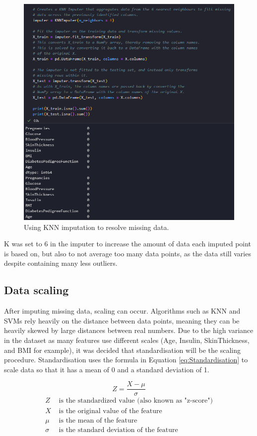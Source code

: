 \documentclass[12pt]{report}
\newcommand{\para}{\vspace{8pt}\noindent}
\begin{document}
\begin{figure}[H]
    \centering
    \includegraphics[width=.8\linewidth]{Preprocessing/KNNImputation.png}
    \caption{Using KNN imputation to resolve missing data.}
    \label{fig:KNNImputation}
\end{figure}

\para K was set to 6 in the imputer to increase the amount of data each imputed point is based on, but also to not average 
too many data points, as the data still varies despite containing many less outliers. 

\subsection{Data scaling}
After imputing missing data, scaling can occur. Algorithms such as KNN and SVMs rely heavily on the distance 
between data points, meaning they can be heavily skewed by large distances between real numbers. Due to the high 
variance in the dataset as many features use different scales (Age, Insulin, SkinThickness, and BMI for example), 
it was decided that standardisation will be the scaling procedure. Standardisation uses the formula in Equation \ref{eq:Standardisation}
to scale data so that it has a mean of 0 and a standard deviation of 1.

\begin{equation}\label{eq:Standardisation}
    Z = \frac{X - \mu}{\sigma}
\end{equation}
\begin{align*}
    Z & \text{ is the standardized value (also known as "z-score")} \\
    X & \text{ is the original value of the feature} \\
    \mu & \text{ is the mean of the feature} \\
    \sigma & \text{ is the standard deviation of the feature}
\end{align*}
\end{document}
